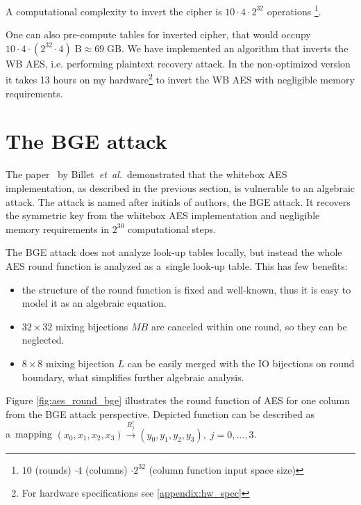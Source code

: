 \documentclass[11pt,oneside,final]{fithesis2}
\newcommand{\eal}{\emph{et~al.}}
\begin{document}
    A computational complexity to invert the cipher
    is $10 \cdot 4 \cdot 2^{32}$ operations \footnote{ $10$ (rounds) $\cdot 4$ (columns) $ \cdot 2^{32}$ (column function input space size)}.
    
    One can also pre-compute tables for inverted cipher, that would occupy $10 \cdot 4 \cdot (2^{32} \cdot 4)\;\text{B} \approx 69\;\text{GB}$.
    We have implemented an algorithm that inverts the WB AES, i.e. performing plaintext recovery attack. 
    In the non-optimized version it takes 13 hours on my hardware\footnote{For hardware specifications see \ref{appendix:hw_spec}} 
    to invert the WB AES with negligible memory requirements.

    \section{The BGE attack}\label{sec:bge_attack}
    The paper~\citep{Billet:2004:CWB:2080787.2080809} by Billet~\eal\ demonstrated that the whitebox AES implementation, as described in the previous section, is vulnerable
    to an algebraic attack. The attack is named after initials of authors, the BGE attack. It recovers the symmetric key from the whitebox AES implementation and
    negligible memory requirements in $2^{30}$ computational steps.
    
    The BGE attack does not analyze look-up tables locally, but instead the whole AES round function is analyzed as a~single look-up table. This has few benefits:
    \begin{itemize}
     \item the structure of the round function is fixed and well-known, thus it is easy to model it as an algebraic equation.
     \item $32\times32$ mixing bijections $MB$ are canceled within one round, so they can be neglected.
     \item $8\times8$ mixing bijection $L$ can be easily merged with the IO bijections on round boundary, what simplifies further algebraic analysis. 
    \end{itemize}
    
    Figure \ref{fig:aes_round_bge} illustrates the round function of AES for one column from the BGE attack perspective. Depicted function can 
    be described as a~mapping $\left(x_0, x_1, x_2, x_3\right) \xrightarrow{R^r_j} \left(y_0, y_1, y_2, y_3\right), \; j=0,\dots,3$.   
    
\end{document}
